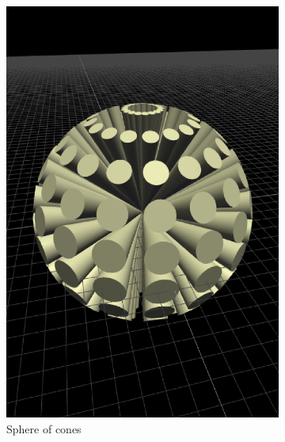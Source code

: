 \begin{figure}
\begin{subfigure}[b]{0.32\linewidth}
    \includegraphics[width=1.0\linewidth]{./images/all_examples/coneSphere_crop}
    \caption{Sphere of cones}
    \label{fig:ex:cone:sphere}
  \end{subfigure}
  \begin{subfigure}[b]{0.32\linewidth}

\end{subfigure}
\end{figure}
